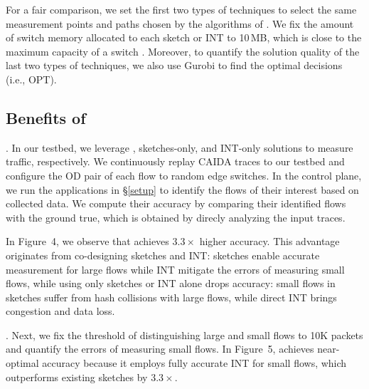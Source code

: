 For a fair comparison, we set the first two types of techniques to select the same measurement points and paths chosen by the algorithms of \sysname. We fix the amount of switch memory allocated to each sketch or INT to 10\,MB, which is close to the maximum capacity of a switch \cite{gupta2018sonata}. Moreover, to quantify the solution quality of the last two types of techniques, we also use Gurobi \cite{gurobi} to find the optimal decisions (i.e., OPT). 

\subsection{Benefits of \sysname}

. In our testbed, we leverage \sysname, sketches-only, and INT-only solutions to measure traffic, respectively. We continuously replay CAIDA traces \cite{caida} to our testbed and configure the OD pair of each flow to random edge switches. In the control plane, we run the applications in \S\ref{setup} to identify the flows of their interest based on collected data. We compute their accuracy by comparing their identified flows with the ground true, which is obtained by direcly analyzing the input traces. 


In Figure~4, we observe that \sysname achieves $3.3\times$ higher accuracy. This advantage originates from co-designing sketches and INT: sketches enable accurate measurement for large flows while INT mitigate the errors of measuring small flows, while using only sketches or INT alone drops accuracy: small flows in sketches suffer from hash collisions with large flows, while direct INT brings congestion and data loss. 

. Next, we fix the threshold of distinguishing large and small flows to 10K packets and quantify the errors of measuring small flows. In Figure~5, \sysname achieves near-optimal accuracy because it employs fully accurate INT for small flows, which outperforms existing sketches by $3.3\times$.  


